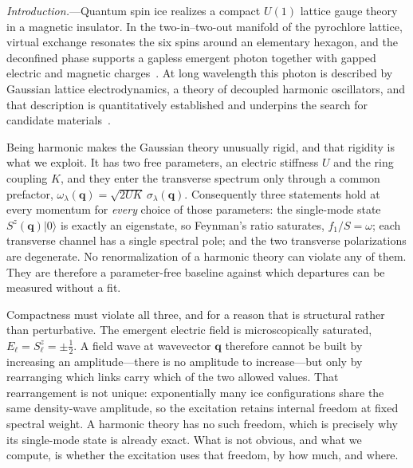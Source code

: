 \documentclass[
aps,prl,twocolumn,amsmath,amssymb,superscriptaddress,
longbibliography,floatfix
]{revtex4-2}
\newcommand{\bq}{\bm q}
\begin{document}
\maketitle

\emph{Introduction.}---Quantum spin ice realizes a compact $U(1)$ lattice
gauge theory in a magnetic insulator. In the two-in--two-out manifold of
the pyrochlore lattice, virtual exchange resonates the six spins around
an elementary hexagon, and the deconfined phase supports a gapless
emergent photon together with gapped electric and magnetic
charges~\cite{Hermele2004,Castelnovo2008,Gingras2014,SavaryBalents2017,
RauGingras2019,Broholm2020}. At long wavelength this photon is described
by Gaussian lattice electrodynamics, a theory of decoupled harmonic
oscillators, and that description is quantitatively established and
underpins the search for candidate
materials~\cite{Benton2012,Shannon2012,KatoOnoda2015,Ross2011,
Sibille2018,Gaudet2019,Gao2019,Smith2022,Poree2025,Gao2025}.

Being harmonic makes the Gaussian theory unusually rigid, and that
rigidity is what we exploit. It has two free parameters, an electric
stiffness $U$ and the ring coupling $K$, and they enter the transverse
spectrum only through a common prefactor,
$\omega_\lambda(\bq)=\sqrt{2UK}\,\sigma_\lambda(\bq)$. Consequently three
statements hold at every momentum for \emph{every} choice of those
parameters: the single-mode state $S^z(\bq)|0\rangle$ is exactly an
eigenstate, so Feynman's ratio saturates, $f_1/S=\omega$; each transverse
channel has a single spectral pole; and the two transverse polarizations
are degenerate. No renormalization of a harmonic theory can violate any
of them. They are therefore a parameter-free baseline against which
departures can be measured without a fit.

Compactness must violate all three, and for a reason that is structural
rather than perturbative. The emergent electric field is microscopically
saturated, $E_\ell=S^z_\ell=\pm\frac12$. A field wave at wavevector $\bq$
therefore cannot be built by increasing an amplitude---there is no
amplitude to increase---but only by rearranging which links carry which
of the two allowed values. That rearrangement is not unique:
exponentially many ice configurations share the same density-wave
amplitude, so the excitation retains internal freedom at fixed spectral
weight. A harmonic theory has no such freedom, which is precisely why its
single-mode state is already exact. What is not obvious, and what we
compute, is whether the excitation uses that freedom, by how much, and
where.
\end{document}
